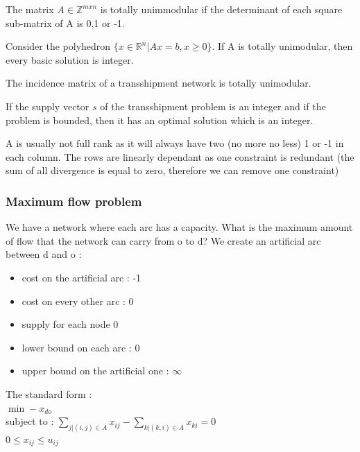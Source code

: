 \documentclass[../main.tex]{subfiles}
\begin{document}
\begin{theoremen}
    The matrix $A \in \mathbb{Z}^{mxn}$ is totally unimmodular if the determinant of each square sub-matrix of A is 0,1 or -1.\\
\end{theoremen}

Consider the polyhedron $\{x\in \mathbb{R}^n \lvert Ax=b, x\geq 0\}$. If A is totally unimodular, then every basic solution is integer.\\

\begin{theoremen}
    The incidence matrix of a transshipment network is totally unimodular.\\
\end{theoremen}

\begin{theoremen}
    If the supply vector $s$ of the transshipment problem is an integer and if the problem is bounded, then it has an optimal solution which is an integer.\\
\end{theoremen}

\warning A is usually not full rank as it will always have two (no more no less) 1 or -1 in each column. The rows are linearly dependant as one constraint is redundant (the sum of all divergence is equal to zero, therefore we can remove one constraint)\\

\subsubsection{Maximum flow problem}
We have a network where each arc has a capacity. What is the maximum amount of flow that the network can carry from o to d? We create an artificial arc between d and o : \begin{itemize}
    \item cost on the artificial arc : -1\\
    \item cost on every other arc : 0\\
    \item supply for each node 0\\
    \item lower bound on each arc : 0\\
    \item upper bound on the artificial one : $\infty$\\
\end{itemize}
The standard form : \\
$\min -x_{do}$\\
subject to : $\sum_{j\lvert (i,j)\in A} x_{ij} - \sum_{k\lvert (k,i) \in A} x_{ki} =0$\\
$0 \leq x_{ij} \leq u_{ij}$\\
\end{document}
